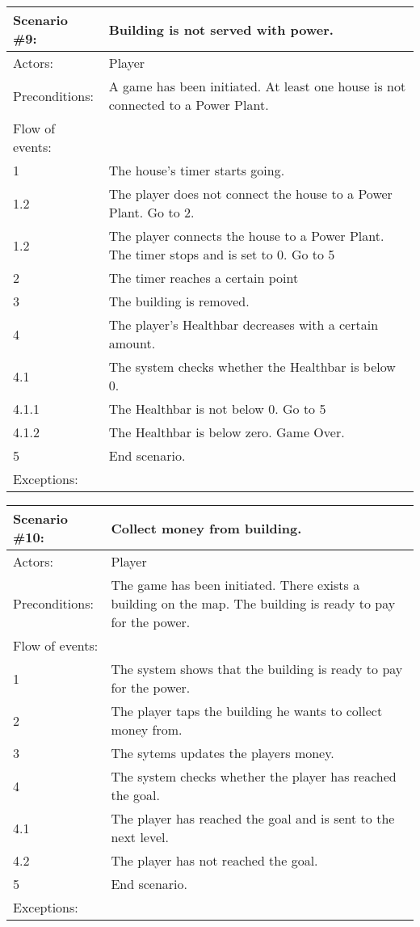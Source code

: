 \begin{tabular}{| l | p{10cm} |}
	\hline
	{\bf Scenario \#9:} & {\bf Building is not served with power.} \\ \hline
	Actors: & Player \\ \hline
	Preconditions: & A game has been initiated. At least one house is not connected to a Power Plant. \\ \hline
	Flow of events: & \\ \hline
	1 & The house's timer starts going. \\ \hline
	1.2 & The player does not connect the house to a Power Plant. Go to 2. \\ \hline
	1.2 & The player connects the house to a Power Plant. The timer stops and is set to 0. Go to 5 \\ \hline
	2 & The timer reaches a certain point \\ \hline
	3 & The building is removed. \\ \hline
	4 & The player's Healthbar decreases with a certain amount. \\ \hline
	4.1 & The system checks whether the Healthbar is below 0. \\ \hline
	4.1.1 & The Healthbar is not below 0. Go to 5 \\ \hline
	4.1.2 & The Healthbar is below zero. Game Over. \\ \hline
	5 & End scenario. \\ \hline
	Exceptions: & \\ \hline	
\end{tabular}

\begin{tabular}{| l | p{10cm} |}
	\hline
	{\bf Scenario \#10:} & {\bf Collect money from building.} \\ \hline
	Actors: & Player \\ \hline
	Preconditions: & The game has been initiated. There exists a building on the map. The building is ready to pay for the power. \\ \hline
	Flow of events: & \\ \hline
	1 & The system shows that the building is ready to pay for the power. \\ \hline
	2 & The player taps the building he wants to collect money from. \\ \hline
	3 & The sytems updates the players money. \\ \hline
	4 & The system checks whether the player has reached the goal. \\ \hline
	4.1 & The player has reached the goal and is sent to the next level. \\ \hline
	4.2 & The player has not reached the goal. \\ \hline
	5 & End scenario. \\ \hline
	Exceptions: & \\ \hline
\end{tabular}